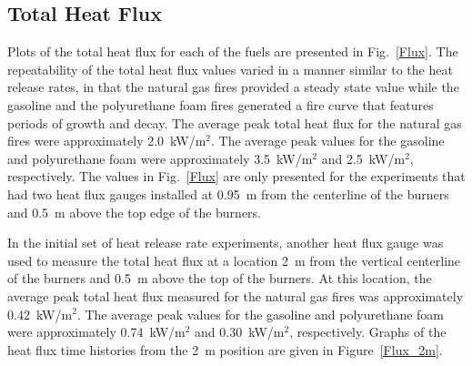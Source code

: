\documentclass[twoside]{uocthesis}
\begin{document}
{\subsection{Total Heat Flux}

Plots of the total heat flux for each of the fuels are presented in Fig.~\ref{Flux}. The repeatability of the total heat flux values varied in a manner similar to the heat release rates, in that the natural gas fires provided a steady state value while the gasoline and the polyurethane foam fires generated a fire curve that features periods of growth and decay.  The average peak total heat flux for the natural gas fires were approximately 2.0~kW/m$^2$.  The average peak values for the gasoline and polyurethane foam were approximately 3.5~kW/m$^2$ and 2.5~kW/m$^2$, respectively.  The values in Fig.~\ref{Flux} are only presented for the experiments that had two heat flux gauges installed at 0.95~m from the centerline of the burners and 0.5~m above the top edge of the burners. 

In the initial set of heat release rate experiments, another heat flux gauge was used to measure the total heat flux at a location 2~m from the vertical centerline of the burners and 0.5~m above the top of the burners.  At this location, the average peak total heat flux measured for the natural gas fires was approximately 0.42~kW/m$^2$.  The average peak values for the gasoline and polyurethane foam were approximately 0.74~kW/m$^2$ and 0.30~kW/m$^2$, respectively. Graphs of the heat flux time histories from the 2~m position are given in Figure~\ref{Flux_2m}. 

}
\end{document}
